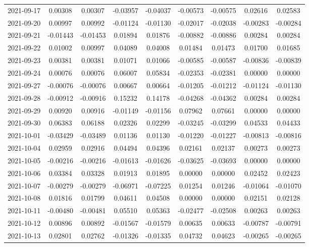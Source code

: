 {\begin{footnotesize}
\begin{longtable}{lcccccccc}
2021-09-17 & 0.00308 & 0.00307 & -0.03957 & -0.04037 & -0.00573 & -0.00575 & 0.02616 & 0.02583 \\
2021-09-20 & 0.00997 & 0.00992 & -0.01124 & -0.01130 & -0.02017 & -0.02038 & -0.00283 & -0.00284 \\
2021-09-21 & -0.01443 & -0.01453 & 0.01894 & 0.01876 & -0.00882 & -0.00886 & 0.00284 & 0.00284 \\
2021-09-22 & 0.01002 & 0.00997 & 0.04089 & 0.04008 & 0.01484 & 0.01473 & 0.01700 & 0.01685 \\
2021-09-23 & 0.00381 & 0.00381 & 0.01071 & 0.01066 & -0.00585 & -0.00587 & -0.00836 & -0.00839 \\
2021-09-24 & 0.00076 & 0.00076 & 0.06007 & 0.05834 & -0.02353 & -0.02381 & 0.00000 & 0.00000 \\
2021-09-27 & -0.00076 & -0.00076 & 0.00667 & 0.00664 & -0.01205 & -0.01212 & -0.01124 & -0.01130 \\
2021-09-28 & -0.00912 & -0.00916 & 0.15232 & 0.14178 & -0.04268 & -0.04362 & 0.00284 & 0.00284 \\
2021-09-29 & 0.00920 & 0.00916 & -0.01149 & -0.01156 & 0.07962 & 0.07661 & 0.00000 & 0.00000 \\
2021-09-30 & 0.06383 & 0.06188 & 0.02326 & 0.02299 & -0.03245 & -0.03299 & 0.04533 & 0.04433 \\
2021-10-01 & -0.03429 & -0.03489 & 0.01136 & 0.01130 & -0.01220 & -0.01227 & -0.00813 & -0.00816 \\
2021-10-04 & 0.02959 & 0.02916 & 0.04494 & 0.04396 & 0.02161 & 0.02137 & 0.00273 & 0.00273 \\
2021-10-05 & -0.00216 & -0.00216 & -0.01613 & -0.01626 & -0.03625 & -0.03693 & 0.00000 & 0.00000 \\
2021-10-06 & 0.03384 & 0.03328 & 0.01913 & 0.01895 & 0.00000 & 0.00000 & 0.02452 & 0.02423 \\
2021-10-07 & -0.00279 & -0.00279 & -0.06971 & -0.07225 & 0.01254 & 0.01246 & -0.01064 & -0.01070 \\
2021-10-08 & 0.01816 & 0.01799 & 0.04611 & 0.04508 & 0.00000 & 0.00000 & 0.02151 & 0.02128 \\
2021-10-11 & -0.00480 & -0.00481 & 0.05510 & 0.05363 & -0.02477 & -0.02508 & 0.00263 & 0.00263 \\
2021-10-12 & 0.00896 & 0.00892 & -0.01567 & -0.01579 & 0.00635 & 0.00633 & -0.00787 & -0.00791 \\
2021-10-13 & 0.02801 & 0.02762 & -0.01326 & -0.01335 & 0.04732 & 0.04623 & -0.00265 & -0.00265 \\

\end{longtable}
\end{footnotesize}}
